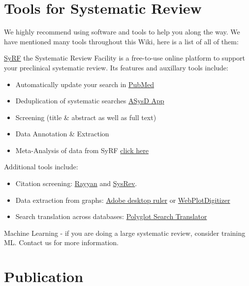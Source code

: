 \documentclass[
]{book}
\begin{document}
\hypertarget{tools-for-systematic-review}{%
\chapter{Tools for Systematic Review}\label{tools-for-systematic-review}}

We highly recommend using software and tools to help you along the way. We have mentioned many tools throughout this Wiki, here is a list of all of them:

\href{http://syrf.org.uk/}{SyRF} the Systematic Review Facility is a free-to-use online platform to support your preclinical systematic review. Its features and auxillary tools include:

\begin{itemize}
\item
  Automatically update your search in \href{https://pubmed.ncbi.nlm.nih.gov/}{PubMed}
\item
  Deduplication of systematic searches \href{https://camarades.shinyapps.io/RDedup/}{ASysD App}
\item
  Screening (title \& abstract as well as full text)
\item
  Data Annotation \& Extraction
\item
  Meta-Analysis of data from SyRF \href{https://camarades.shinyapps.io/meta-analysis-app/}{click here}
\end{itemize}

Additional tools include:

\begin{itemize}
\item
  Citation screening: \href{https://rayyan.qcri.org/welcome}{Rayyan} and \href{https://sysrev.com/}{SysRev}.
\item
  Data extraction from graphs: \href{https://helpx.adobe.com/acrobat/using/grids-guides-measurements-pdfs.html}{Adobe desktop ruler} or \href{https://automeris.io/WebPlotDigitizer/}{WebPlotDigitizer}
\item
  Search translation across databases: \href{https://sr-accelerator.com/\#/polyglot}{Polyglot Search Translator}
\end{itemize}

Machine Learning - if you are doing a large systematic review, consider training ML.
Contact us for more information.

\hypertarget{publication}{%
\chapter{Publication}\label{publication}}
\end{document}
